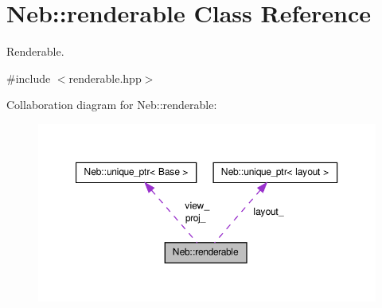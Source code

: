 \hypertarget{classNeb_1_1renderable}{\section{\-Neb\-:\-:renderable \-Class \-Reference}
\label{classNeb_1_1renderable}
}


\-Renderable.  




{\ttfamily \#include $<$renderable.\-hpp$>$}



\-Collaboration diagram for \-Neb\-:\-:renderable\-:
\nopagebreak
\begin{figure}[H]
\begin{center}
\leavevmode
\includegraphics[width=350pt]{classNeb_1_1renderable__coll__graph}
\end{center}
\end{figure}
